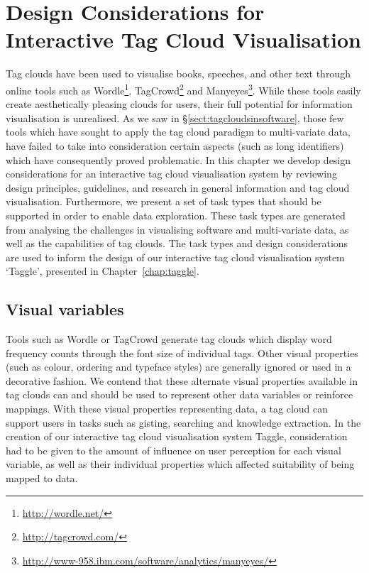 \chapter{Design Considerations for Interactive Tag Cloud Visualisation}
\label{chap:tagcloud}
\ifpdf
    \graphicspath{{Chapters/TagCloudDesign/TagCloudDesignFigs/PNG/}{Chapters/TagCloudDesign/TagCloudDesignFigs/PDF/}{Chapters/TagCloudDesign/TagCloudDesignFigs/}}
\else
    \graphicspath{{Chapters/TagCloudDesign/TagCloudDesignFigs/EPS/}{Chapters/TagCloudDesign/TagCloudDesignFigs/}}
\fi


Tag clouds have been used to visualise books, speeches, and other text through online tools such as Wordle\footnote{\url{http://wordle.net/}}, TagCrowd\footnote{\url{http://tagcrowd.com/}} and Manyeyes\footnote{\url{http://www-958.ibm.com/software/analytics/manyeyes/}}. While these tools easily create aesthetically pleasing clouds for users, their full potential for information visualisation is unrealised. As we saw in \S\ref{sect:tagcloudsinsoftware}, those few tools which have sought to apply the tag cloud paradigm to multi-variate data, have failed to take into consideration certain aspects (such as long identifiers) which have consequently proved problematic. In this chapter we develop design considerations for an interactive tag cloud visualisation system by reviewing design principles, guidelines, and research in general information and tag cloud visualisation. Furthermore, we present a set of task types that should be supported in order to enable data exploration. These task types are generated from analysing the challenges in visualising software and multi-variate data, as well as the capabilities of tag clouds. The task types and design considerations are used to inform the design of our interactive tag cloud visualisation system `Taggle', presented in Chapter~\ref{chap:taggle}.

\section{Visual variables}\label{sect:visualvariables}

Tools such as Wordle or TagCrowd generate tag clouds which display word frequency counts through the font size of individual tags. Other visual properties (such as colour, ordering and typeface styles) are generally ignored or used in a decorative fashion. We contend that these alternate visual properties available in tag clouds can and should be used to represent other data variables or reinforce mappings. With these visual properties representing data, a tag cloud can support users in tasks such as gisting, searching and knowledge extraction. In the creation of our interactive tag cloud visualisation system Taggle, consideration had to be given to the amount of influence on user perception for each visual variable, as well as their individual properties which affected suitability of being mapped to data. 

